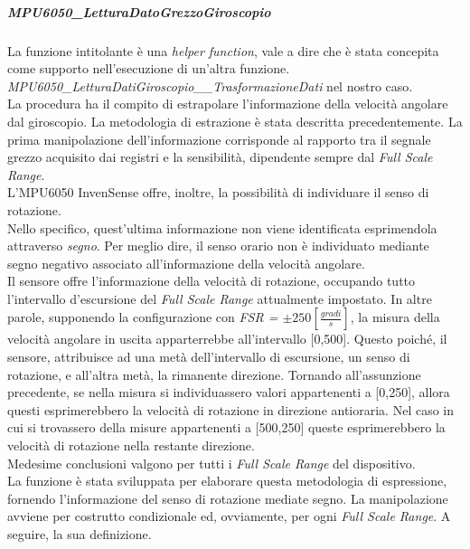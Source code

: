 \subparagraph{MPU6050\_LetturaDatoGrezzoGiroscopio}
La funzione intitolante è una \textit{helper function}, vale a dire che è stata concepita come supporto nell'esecuzione di un'altra funzione.\\
\textit{MPU6050\_LetturaDatiGiroscopio\_\_TrasformazioneDati} nel nostro caso.\\
La procedura ha il compito di estrapolare l'informazione della velocità angolare dal giroscopio. La metodologia di estrazione è stata descritta precedentemente. 
La prima manipolazione dell'informazione corrisponde al rapporto tra il segnale grezzo acquisito dai registri e la sensibilità, dipendente sempre dal \textit{Full Scale Range}.\\
L'MPU6050 InvenSense offre, inoltre, la possibilità di individuare il senso di rotazione.\\
Nello specifico, quest'ultima informazione non viene identificata esprimendola attraverso \textit{segno}. Per meglio dire, il senso orario non è individuato mediante segno negativo associato all'informazione della velocità angolare.\\
Il sensore offre l'informazione della velocità di rotazione, occupando tutto l'intervallo d'escursione del \textit{Full Scale Range} attualmente impostato. In altre parole, supponendo la configurazione con \textit{FSR = $\pm250[\frac{gradi}{s}]$}, la misura della velocità angolare in uscita apparterrebbe all'intervallo [0,500].
Questo poiché, il sensore, attribuisce ad una metà dell'intervallo di escursione, un senso di rotazione, e all'altra metà, la rimanente direzione. Tornando all'assunzione precedente, se nella misura si individuassero valori appartenenti a [0,250], allora questi esprimerebbero la velocità di rotazione in direzione antioraria. 
Nel caso in cui si trovassero della misure appartenenti a [500,250] queste esprimerebbero la velocità di rotazione nella restante direzione.\\
Medesime conclusioni valgono per tutti i \textit{Full Scale Range} del dispositivo.\\
La funzione è stata sviluppata per elaborare questa metodologia di espressione, fornendo l'informazione del senso di rotazione mediate segno. La manipolazione avviene per costrutto condizionale ed, ovviamente, per ogni \textit{Full Scale Range}.
A seguire, la sua definizione.


